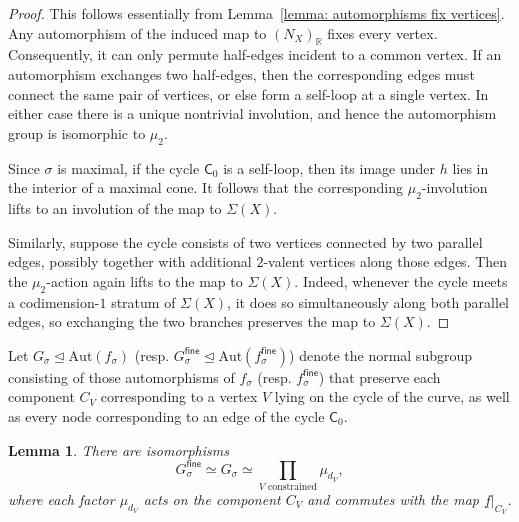 \documentclass{article}
\def\R{\mathbb{R}}
\newtheorem{lemma}[definition]{Lemma}
\newcommand{\tropC}{\mathsf{C}}
\newcommand{\fine}{\mathsf{fine}}
\begin{document}
\begin{proof}
This follows essentially from Lemma~\ref{lemma: automorphisms fix vertices}. Any automorphism of the induced map to $(N_X)_\R$ fixes every vertex. Consequently, it can only permute half-edges incident to a common vertex. If an automorphism exchanges two half-edges, then the corresponding edges must connect the same pair of vertices, or else form a self-loop at a single vertex. In either case there is a unique nontrivial involution, and hence the automorphism group is isomorphic to $\mu_2$.

Since $\sigma$ is maximal, if the cycle $\tropC_0$ is a self-loop, then its image under $h$ lies in the interior of a maximal cone. It follows that the corresponding $\mu_2$-involution lifts to an involution of the map to $\Sigma(X)$.

Similarly, suppose the cycle consists of two vertices connected by two parallel edges, possibly together with additional $2$-valent vertices along those edges. Then the $\mu_2$-action again lifts to the map to $\Sigma(X)$. Indeed, whenever the cycle meets a codimension-$1$ stratum of $\Sigma(X)$, it does so simultaneously along both parallel edges, so exchanging the two branches preserves the map to $\Sigma(X)$.

\end{proof}



Let $G_\sigma \trianglelefteq \mathrm{Aut}(f_\sigma)$ (resp. $G^\fine_\sigma \trianglelefteq \mathrm{Aut}(f_\sigma^\fine)$) denote the normal subgroup consisting of those automorphisms of $f_\sigma$ (resp. $f_\sigma^\fine$) that preserve each component $C_V$ corresponding to a vertex $V$ lying on the cycle of the curve, as well as every node corresponding to an edge of the cycle $\tropC_0$.


\begin{lemma} \label{lem: automorphisms dV}
    There are isomorphisms
    \[
    G_\sigma^\fine \simeq G_\sigma \simeq \prod_{V \text{ constrained}} \mu_{d_V},
    \]
    where each factor $\mu_{d_V}$ acts on the component $C_V$ and commutes with the map $\underline{f}|_{C_{V}}$.
\end{lemma}
\end{document}
